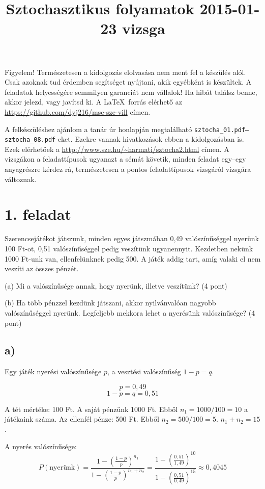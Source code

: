 \documentclass[a4paper,12pt]{article}   		%
\title{Sztochasztikus folyamatok 2015-01-23 vizsga}
\begin{document}
\maketitle

Figyelem! Természetesen a kidolgozás elolvasása nem ment fel a készülés
alól. Csak azoknak tud érdemben segítséget nyújtani, akik egyébként is
készültek. A feladatok helyességére semmilyen garanciát nem vállalok!
Ha hibát találsz benne, akkor jelezd, vagy javítsd ki. A \LaTeX\ forrás
elérhető az \url{https://github.com/dyj216/msc-sze-vill} címen.

A felkészüléshez ajánlom a tanár úr honlapján megtalálható 
\texttt{\mbox{sztocha\_01.pdf}--\mbox{sztocha\_08.pdf}}-eket. Ezekre 
vannak hivatkozások ebben a kidolgozásban is. Ezek elérhetőek a 
\url{http://www.sze.hu/~harmati/sztocha2.html} címen. A vizsgákon a 
feladattípusok ugyanazt a sémát követik, minden feladat egy--egy 
anyagrészre kérdez rá, természetesen a pontos feladattípusok vizsgáról
vizsgára változnak.

\section*{1. feladat}
Szerencsejátékot játszunk, minden egyes játszmában 0,49 valószínűséggel
nyerünk 100 Ft-ot, 0,51 valószínűséggel pedig veszítünk ugyanennyit. 
Kezdetben nekünk 1000 Ft-unk van, ellenfelünknek pedig 500. A játék
addig tart, amíg valaki el nem veszíti az összes pénzét.

(a) Mi a valószínűsége annak, hogy nyerünk, illetve veszítünk? (4 pont)

(b) Ha több pénzzel kezdünk játszani, akkor nyilvánvalóan nagyobb 
valószínűséggel nyerünk. Legfeljebb mekkora lehet a nyerésünk
valószínűsége? (4 pont)
\subsection*{a)}
Egy játék nyerési valószínűsége $p$, a vesztési valószínűség $1-p=q$.

\[p = 0,49\]
\[1-p = q = 0,51\]

A tét mértéke: 100 Ft. A saját pénzünk 1000 Ft. Ebből $n_1 = 1000/100=10$ a 
játékaink száma. Az ellenfél pénze: 500 Ft. Ebből $n_2 = 500/100=5$.
$n_1 + n_2 = 15$.

A nyerés valószínűsége:
\[P(\text{nyerünk}) = \frac{1-\left(\frac{1-p}{p}\right)^{n_1}}
{1-\left(\frac{1-p}{p}\right)^{n_1+n_2}} = 
\frac{1-\left(\frac{0,51}{1,49}\right)^{10}}
{1-\left(\frac{0,51}{0,49}\right)^{15}} \approx 0,4045 \]
\end{document}
